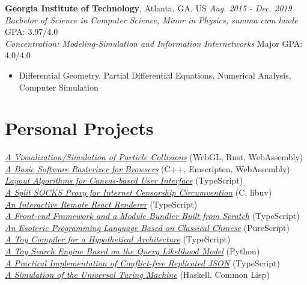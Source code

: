 \documentclass[11pt]{article}
\begin{document}
\vspace{1em}
\textbf{Georgia Institute of Technology}, Atlanta, GA, US \hfill \textit{Aug. 2015 - Dec. 2019}\\
\textit{Bachelor of Science in Computer Science, Minor in Physics, \textit{summa cum laude}} \hfill GPA: 3.97/4.0\\
\textit{Concentration: Modeling-Simulation and Information Internetworks} \hfill Major GPA: 4.0/4.0
\begin{itemize}
\item Differential Geometry, Partial Differential Equations, Numerical Analysis, Computer Simulation
\end{itemize}

\section*{Personal Projects}
\href{https://github.com/galmungral/particle-simulation}{\textit{A Visualization/Simulation of Particle Collisions}} \hfill (WebGL, Rust, WebAssembly) \\
\href{https://github.com/galmungral/rasterizer}{\textit{A Basic Software Rasterizer for Browsers}} \hfill (C++, Emscripten, WebAssembly) \\
\href{https://github.com/galmungral/michelangelo}{\textit{Layout Algorithms for Canvas-based User Interface}} \hfill (TypeScript) \\
\href{https://github.com/galmungral/telescope}{\textit{A Split SOCKS Proxy for Internet Censorship Circumvention}} \hfill (C, libuv) \\
\href{https://github.com/galmungral/react-teletype}{\textit{An Interactive Remote React Renderer}} \hfill (TypeScript) \\
\href{https://github.com/galmungral/replay}{\textit{A Front-end Framework and a Module Bundler Built from Scratch}} \hfill (TypeScript) \\
\href{https://github.com/galmungral/hanbun-lang}{\textit{An Esoteric Programming Language Based on Classical Chinese}} \hfill (PureScript) \\
\href{https://github.com/galmungral/sketchpad}{\textit{A Toy Compiler for a Hypothetical Architecture}} \hfill (TypeScript) \\
\href{https://github.com/galmungral/plato}{\textit{A Toy Search Engine Based on the Query Likelihood Model}} \hfill (Python) \\
\href{https://github.com/galmungral/json-crdt}{\textit{A Practical Implementation of Conflict-free Replicated JSON}} \hfill (TypeScript) \\
\href{https://github.com/galmungral/turing-machine}{\textit{A Simulation of the Universal Turing Machine}} \hfill (Haskell, Common Lisp) \\
\end{document}
